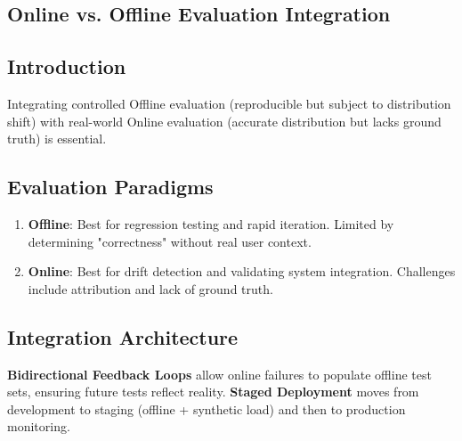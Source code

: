 \begin{TNtwocol}
\section{Online vs. Offline Evaluation Integration}
\subsection{Introduction}
Integrating controlled Offline evaluation (reproducible but subject to distribution shift) with real-world Online evaluation (accurate distribution but lacks ground truth) is essential.

\subsection{Evaluation Paradigms}
\begin{enumerate}
    \item \textbf{Offline}: Best for regression testing and rapid iteration. Limited by determining "correctness" without real user context.
    \item \textbf{Online}: Best for drift detection and validating system integration. Challenges include attribution and lack of ground truth.
\end{enumerate}

\subsection{Integration Architecture}
\textbf{Bidirectional Feedback Loops} allow online failures to populate offline test sets, ensuring future tests reflect reality. \textbf{Staged Deployment} moves from development to staging (offline + synthetic load) and then to production monitoring.
\end{TNtwocol}
